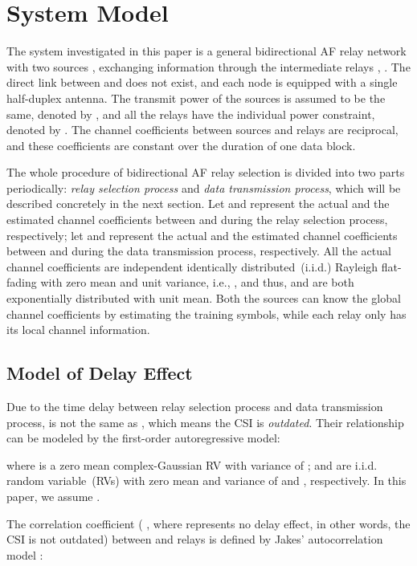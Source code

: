 \documentclass[onecolumn,letterpaper,11pt,draftclsnofoot]{IEEEtran}
\begin{document}
\section{System Model}

The system investigated in this paper is a general bidirectional AF
relay network with two sources ,  exchanging information
through the intermediate  relays , . The
direct link between  and  does not exist, and each node is
equipped with a single half-duplex antenna. The transmit power of
the sources is assumed to be the same, denoted by , and all the
relays have the individual power constraint, denoted by . The
channel coefficients between sources and relays are reciprocal, and
these coefficients are constant over the duration of one data block.

The whole procedure of bidirectional AF relay selection is divided
into two parts periodically: \emph{relay selection process} and
\emph{data transmission process}, which will be described concretely
in the next section. Let  and  represent
the actual and the estimated channel coefficients between  and
 during the relay selection process, respectively; let
 and  represent the actual and the
estimated channel coefficients between  and  during the
data transmission process, respectively. All the actual channel
coefficients are independent identically distributed~(i.i.d.)
Rayleigh flat-fading with zero mean and unit variance, i.e.,
, and thus,
 and 
are both exponentially distributed with unit mean. Both the sources
can know the global channel coefficients by estimating the training
symbols, while each relay only has its local channel information.

\subsection{Model of Delay Effect}
Due to the time delay between relay selection process and data
transmission process,  is not the same as ,
which means the CSI is \emph{outdated}. Their relationship can be
modeled by the first-order autoregressive
model\cite{Michalopoulos2010}:

where  is a zero mean complex-Gaussian RV with variance of
;  and  are i.i.d.
random variable~(RVs) with zero mean and variance of  and , respectively. In this
paper, we assume .

The correlation coefficient  ( , where  represents no delay effect, in other words,
the CSI is not outdated) between  and relays is defined by
Jakes' autocorrelation model \cite{Michalopoulos2010}:
\end{document}
